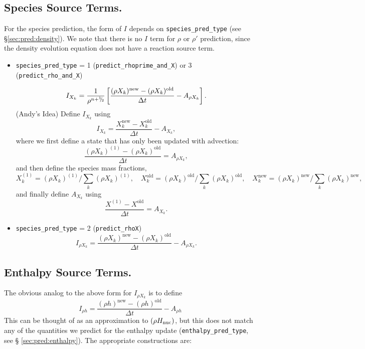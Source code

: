 \subsection{Species Source Terms.}
For the species prediction, the form of $I$ depends on
{\tt species\_pred\_type} (see \S \ref{sec:pred:density}).
We note that there is no $I$ term for $\rho$ or $\rho'$ prediction, since
the density evolution equation does not have a reaction source term.
\begin{itemize}
\item {\tt species\_pred\_type} = 1 ({\tt predict\_rhoprime\_and\_X})
or 3 ({\tt predict\_rho\_and\_X})

\begin{equation}
I_{X_k} = \frac{1}{\rho^{n+\myhalf}} \left [ 
      \frac{(\rho X_k)^\mathrm{new} - 
            (\rho X_k)^\mathrm{old}}{\Delta t} - A_{\rho X_k}  \right ].
\end{equation}
(Andy's Idea) Define $I_{X_k}$ using
\begin{equation}
I_{X_k} = \frac{X_k^\mathrm{new} - X_k^\mathrm{old}}{\Delta t} - A_{X_k},
\end{equation}
where we first define a state that has only been updated with advection:
\begin{equation}
\frac{(\rho X_k)^{(1)} - (\rho X_k)^\mathrm{old}}{\Delta t} = A_{\rho X_k},
\end{equation}
and then define the species mass fractions,
\begin{equation}
X_k^{(1)} = (\rho X_k)^{(1)} / \sum_k (\rho X_k)^{(1)}, \quad 
X_k^\mathrm{old} = (\rho X_k)^\mathrm{old} / \sum_k (\rho X_k)^\mathrm{old}, \quad 
X_k^\mathrm{new} = (\rho X_k)^\mathrm{new} / \sum_k (\rho X_k)^\mathrm{new},
\end{equation}
and finally define $A_{X_k}$ using
\begin{equation}
\frac{X^{(1)} - X^\mathrm{old}}{\Delta t}= A_{X_k}.
\end{equation}
\item {\tt species\_pred\_type} = 2 ({\tt predict\_rhoX})
\begin{equation}
I_{\rho X_k} = \frac{(\rho X_k)^\mathrm{new} - (\rho X_k)^\mathrm{old}}{\Delta t} - A_{\rho X_k}.
\label{eq:sdc:Irhoo}
\end{equation}
\end{itemize}

\subsection{Enthalpy Source Terms.}
The obvious analog to the above form for $I_{\rho X_k}$ is to define
\begin{equation}
I_{\rho h}  = \frac{(\rho h)^\mathrm{new} - (\rho h)^\mathrm{old}}{\Delta t} - A_{\rho h}
\label{eq:sdc:Irhoh}
\end{equation}
This can be thought of as an approximation to $(\rho {H_{\rm nuc}})$,
but this does not match any of the quantities we predict for the
enthalpy update ({\tt enthalpy\_pred\_type}, see \S
\ref{sec:pred:enthalpy}).  The appropriate constructions
are:

